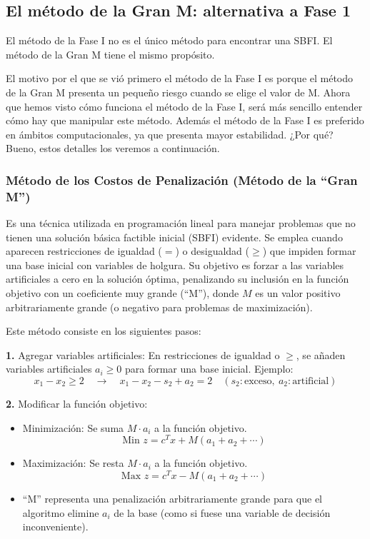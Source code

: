 \subsection{El método de la Gran M: alternativa a Fase 1}

El método de la Fase I no es el único método para encontrar una SBFI. El método de la Gran M tiene el mismo propósito.

El motivo por el que se vió primero el método de la Fase I es porque el método de la Gran M presenta un pequeño riesgo cuando se elige el valor de M. Ahora que hemos visto cómo funciona el método de la Fase I, será más sencillo entender cómo hay que manipular este método. Además el método de la Fase I es preferido en ámbitos computacionales, ya que presenta mayor estabilidad. ¿Por qué? Bueno, estos detalles los veremos a continuación.

\subsubsection{Método de los Costos de Penalización (Método de la ``Gran M'')}

Es una técnica utilizada en programación lineal para manejar problemas que no tienen una solución básica factible inicial (SBFI) evidente. Se emplea cuando aparecen restricciones de igualdad (\(=\)) o desigualdad (\(\geq\)) que impiden formar una base inicial con variables de holgura. Su objetivo es forzar a las variables artificiales a cero en la solución óptima, penalizando su inclusión en la función objetivo con un coeficiente muy grande (``M''), donde \(M\) es un valor positivo arbitrariamente grande (o negativo para problemas de maximización).

Este método consiste en los siguientes pasos:

\noindent\textbf{1.} Agregar variables artificiales: En restricciones de igualdad o \(\geq\), se añaden variables artificiales \(a_i \geq 0\) para formar una base inicial. Ejemplo:  
\[
  x_1 - x_2 \geq 2 \quad \rightarrow \quad x_1 - x_2 - s_2 + a_2 = 2 \quad (s_2: \text{exceso}, \ a_2: \text{artificial})
\]

\noindent\textbf{2.} Modificar la función objetivo:
\begin{itemize}
  \item Minimización: Se suma \(M \cdot a_i\) a la función objetivo.  
  \[
  \text{Min } z = c^T x + M(a_1 + a_2 + \cdots)
  \]
  \item Maximización: Se resta \(M \cdot a_i\) a la función objetivo.  
  \[
    \text{Max } z = c^T x - M(a_1 + a_2 + \cdots)
  \]
  \item ``M'' representa una penalización arbitrariamente grande para que el algoritmo elimine \(a_i\) de la base (como si fuese una variable de decisión inconveniente).
\end{itemize}  

